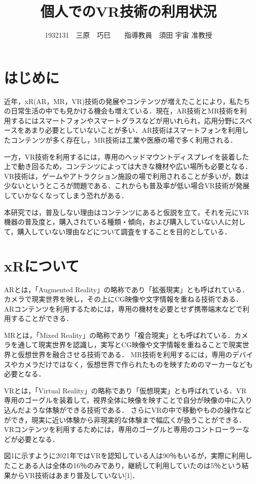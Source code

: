 \documentclass[twocolumn,10pt,a4j]{ltjsarticle}
\title{個人でのVR技術の利用状況}
\author{1932131　三原　巧巳　　指導教員　須田 宇宙 准教授}
\date{}
\begin{document}
\maketitle

\section{はじめに}
近年，xR(AR，MR，VR)技術の発展やコンテンツが増えたことにより，私たちの日常生活の中でも見かける機会も増えている．現在，AR技術とMR技術を利用するにはスマートフォンやスマートグラスなどが用いれられ，応用分野にスペースをあまり必要としていないことが多い．AR技術はスマートフォンを利用したコンテンツが多く存在し，MR技術は工業や医療の場で多く利用される．

一方，VR技術を利用するには，専用のヘッドマウントディスプレイを装着した上で動き回るため，コンテンツによっては大きな機材や広い場所も必要となる．VR技術は，ゲームやアトラクション施設の場で利用されることが多いが，数は少ないというところが問題である．これからも普及率が低い場合VR技術が発展していかなくなってしまう恐れがある．

本研究では，普及しない理由はコンテンツにあると仮説を立て，それを元にVR機器の普及度と，購入されている種類・傾向，および購入していない人に対して，購入していない理由などについて調査をすることを目的としている．

\section{xRについて}
ARとは，「Augmented Reality」の略称であり「拡張現実」とも呼ばれている．
カメラで現実世界を映し，その上にCG映像や文字情報を重ねる技術である．
ARコンテンツを利用するためには，専用の機材を必要とせず携帯端末などで利用することができる．

MRとは，「Mixed Reality」の略称であり「複合現実」とも呼ばれている．カメラを通して現実世界を認識し，実写とCG映像や文字情報を重ねることで現実世界と仮想世界を融合させる技術である．
MR技術を利用するには，専用のデバイスやカメラだけではなく，仮想世界で作られたものを映すためのマーカーなども必要となる．

VRとは，「Virtual Reality」の略称であり「仮想現実」とも呼ばれている．VR専用のゴーグルを装着して，視界全体に映像を映すことで自分が映像の中に入り込んだような体験ができる技術である．
さらにVRの中で移動やものの操作などができ，現実に近い体験から非現実的な体験まで幅広くが扱うことができる．
VRコンテンツを利用するためには，専用のゴーグルと専用のコントローラーなどが必要となる．

図1に示すように2021年ではVRを認知している人は90％もいるが，実際に利用したことある人は全体の16％のみであり，継続して利用していたのは5％という結果からVR技術はあまり普及していない[1]．
\end{document}
